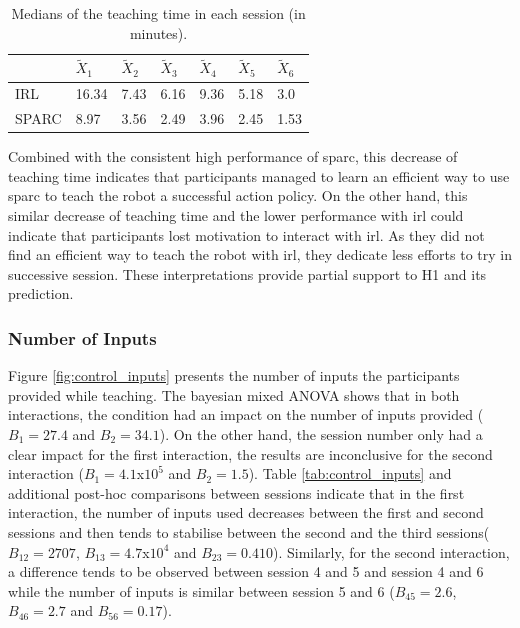 \begin{table}[ht]
	\centering
	\caption{Medians of the teaching time in each session (in minutes).}
	\label{tab:control_time}
	\begin{tabular}{@{}lllllll@{}}\toprule
		& $\widetilde{X}_{1}$ & $\widetilde{X}_{2}$ & $\widetilde{X}_{3}$ & $\widetilde{X}_{4}$ & $\widetilde{X}_{5}$ & $\widetilde{X}_{6}$\\ 
		\midrule
    IRL & 16.34 & 7.43 & 6.16 & 9.36 & 5.18 & 3.0\\
    SPARC & 8.97 & 3.56 & 2.49 & 3.96 & 2.45 & 1.53\\
    \bottomrule
	\end{tabular}
\end{table}

Combined with the consistent high performance of \gls{sparc}, this decrease of teaching time indicates that participants managed to learn an efficient way to use \gls{sparc} to teach the robot a successful action policy. On the other hand, this similar decrease of teaching time and the lower performance with \gls{irl} could indicate that participants lost motivation to interact with \gls{irl}. As they did not find an efficient way to teach the robot with \gls{irl}, they dedicate less efforts to try in successive session. These interpretations provide partial support to H1 and its prediction.

\subsubsection{Number of Inputs}
Figure \ref{fig:control_inputs} presents the number of inputs the participants provided while teaching. The bayesian mixed ANOVA shows that in both interactions, the condition had an impact on the number of inputs provided ($B_1=27.4$ and $B_2 = 34.1$). On the other hand,  the session number only had a clear impact for the first interaction, the results are inconclusive for the second interaction ($B_1=4.1$x$10^5$ and $B_2 = 1.5$). Table \ref{tab:control_inputs} and additional post-hoc comparisons between sessions indicate that in the first interaction, the number of inputs used decreases between the first and second sessions and then tends to stabilise between the second and the third sessions($B_{12}=2707$, $B_{13}=4.7$x$10^4$ and $B_{23}=0.410$). Similarly, for the second interaction, a difference tends to be observed between session 4 and 5 and session 4 and 6 while the number of inputs is similar between session 5 and 6 ($B_{45}=2.6$, $B_{46}=2.7$ and $B_{56}=0.17$).

